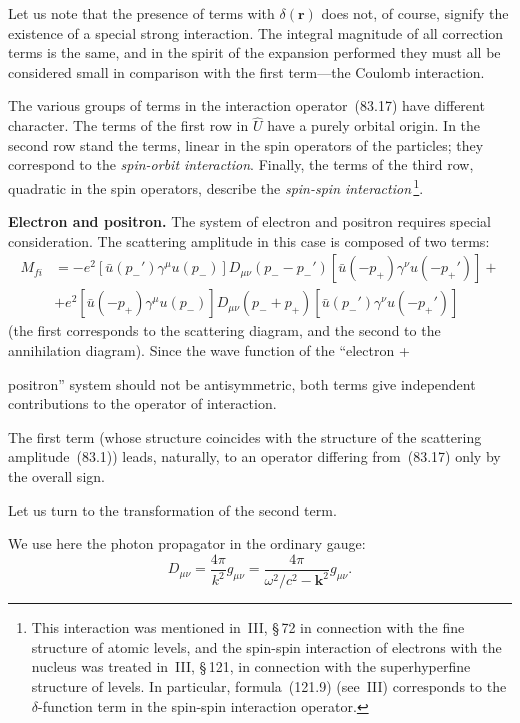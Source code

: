 Let us note that the presence of terms with $\delta(\mathbf{r})$ does not, of course, signify the existence of a special strong interaction. The integral magnitude of all correction terms is the same, and in the spirit of the expansion performed they must all be considered small in comparison with the first term---the Coulomb interaction.

The various groups of terms in the interaction operator~(83.17) have different character. The terms of the first row in $\hat{U}$ have a purely orbital origin. In the second row stand the terms, linear in the spin operators of the particles; they correspond to the \textit{spin-orbit interaction}. Finally, the terms of the third row, quadratic in the spin operators, describe the \textit{spin-spin interaction}\,\footnote{This interaction was mentioned in~III, \S\,72 in connection with the fine structure of atomic levels, and the spin-spin interaction of electrons with the nucleus was treated in~III, \S\,121, in connection with the superhyperfine structure of levels. In particular, formula~(121.9) (see~III) corresponds to the $\delta$-function term in the spin-spin interaction operator.}.

\textbf{Electron and positron.} The system of electron and positron requires special consideration. The scattering amplitude in this case is composed of two terms:
\begin{equation}
\begin{split}
M_{fi} &= -e^2[\bar{u}(p_-')\gamma^\mu u(p_-)]D_{\mu\nu}(p_- - p_-')[\bar{u}(-p_+)\gamma^\nu u(-p_+')]+{}\\
&+ e^2[\bar{u}(-p_+)\gamma^\mu u(p_-)]D_{\mu\nu}(p_- + p_+)[\bar{u}(p_-')\gamma^\nu u(-p_+')]
\end{split}
\tag{83.18}
\end{equation}
(the first corresponds to the scattering diagram, and the second to the annihilation diagram). Since the wave function of the ``electron +

positron'' system should not be antisymmetric, both terms give independent contributions to the operator of interaction.

The first term (whose structure coincides with the structure of the scattering amplitude~(83.1)) leads, naturally, to an operator differing from~(83.17) only by the overall sign.

Let us turn to the transformation of the second term.

We use here the photon propagator in the ordinary gauge:
\begin{equation}
D_{\mu\nu} = \frac{4\pi}{k^2}g_{\mu\nu} = \frac{4\pi}{\omega^2/c^2 - \mathbf{k}^2}g_{\mu\nu}.
\tag{83.19}
\end{equation}


